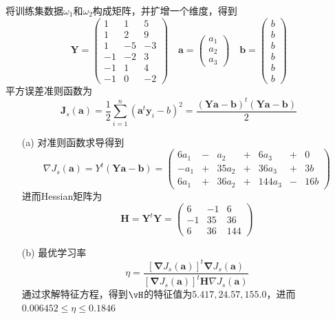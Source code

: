 \documentclass[reportComp]{thesis}
\begin{document}
\begin{answer}[\textsection 5 Q14]
将训练集数据$\omega_1$和$\omega_2$构成矩阵，并扩增一个维度，得到
\[\mathbf{Y}=\left(\begin{array}{rrr}{1} & {1} & {5} \\ {1} & {2} & {9} \\ {1} & {-5} & {-3} \\ {-1} & {-2} & {3} \\ {-1} & {1} & {4} \\ {-1} & {0} & {-2}\end{array}\right) \quad \mathbf{a}=\left(\begin{array}{r}{a_{1}} \\ {a_{2}} \\ {a_{3}}\end{array}\right) \quad \mathbf{b}=\left(\begin{array}{c}{b} \\ {b} \\ {b} \\ {b} \\ {b} \\ {b}\end{array}\right)\]
平方误差准则函数为
\[\mathbf{J}_{s}(\mathbf{a})=\frac{1}{2} \sum_{i=1}^{n}\left(\mathbf{a}^{t} \mathbf{y}_{i}-b\right)^{2}=\frac{(\mathbf{Y} \mathbf{a}-\mathbf{b})^{t}(\mathbf{Y} \mathbf{a}-\mathbf{b})}{2}\]
\begin{itemize}
	\item [(a)] 对准则函数求导得到
	\[\nabla J_{s}(\mathbf{a})=Y^{t}(\mathbf{Y} \mathbf{a}-\mathbf{b})=\left(
	\begin{array}{ccccccc}{6 a_{1}} & {-} & {a_{2}} & {+} & {6 a_{3}} & {+} & {0} \\
	{-a_{1}} & {+} & {35 a_{2}} & {+} & {36 a_{3}} & {+} & {3 b} \\
	{6 a_{1}} & {+} & {36 a_{2}} & {+} & {144 a_{3}} & {-} & {16 b}
	\end{array}\right)\]
	进而Hessian矩阵为
	\[\mathbf{H}=\mathbf{Y}^{t} \mathbf{Y}=\left(\begin{array}{ccc}{6} & {-1} & {6} \\ {-1} & {35} & {36} \\ {6} & {36} & {144}\end{array}\right)\]
	\item [(b)] 最优学习率
	\[\eta=\frac{\left[\boldsymbol{\nabla} J_{s}(\mathbf{a})\right]^{t} \boldsymbol{\nabla} J_{s}(\mathbf{a})}{\left[\boldsymbol{\nabla} J_{s}(\mathbf{a})\right]^{t} \mathbf{H} \nabla J_{s}(\mathbf{a})}\]
	通过求解特征方程，得到$\vH$的特征值为$5.417,24.57,155.0$，进而$0.006452\leq\eta\leq 0.1846$
\end{itemize}
\end{answer}
\end{document}
